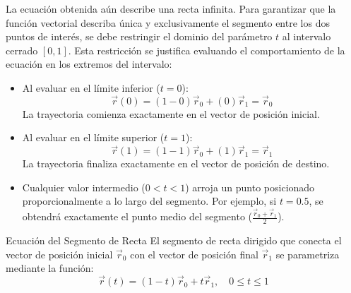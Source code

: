La ecuación obtenida aún describe una recta infinita. Para garantizar que la función vectorial describa única y exclusivamente el segmento entre los dos puntos de interés, se debe restringir el dominio del parámetro $t$ al intervalo cerrado $[0, 1]$. Esta restricción se justifica evaluando el comportamiento de la ecuación en los extremos del intervalo:

\begin{itemize}
    \item Al evaluar en el límite inferior ($t = 0$): 
    \[ \vec{r}(0) = (1 - 0)\vec{r}_0 + (0)\vec{r}_1 = \vec{r}_0 \] 
    La trayectoria comienza exactamente en el vector de posición inicial.
    
    \item Al evaluar en el límite superior ($t = 1$): 
    \[ \vec{r}(1) = (1 - 1)\vec{r}_0 + (1)\vec{r}_1 = \vec{r}_1 \] 
    La trayectoria finaliza exactamente en el vector de posición de destino.
    
    \item Cualquier valor intermedio ($0 < t < 1$) arroja un punto posicionado proporcionalmente a lo largo del segmento. Por ejemplo, si $t = 0.5$, se obtendrá exactamente el punto medio del segmento ($\frac{\vec{r}_0 + \vec{r}_1}{2}$).
\end{itemize}

\begin{mydefinition}{Ecuación del Segmento de Recta}
El segmento de recta dirigido que conecta el vector de posición inicial $\vec{r}_0$ con el vector de posición final $\vec{r}_1$ se parametriza mediante la función:
\[ \vec{r}(t) = (1 - t)\vec{r}_0 + t\vec{r}_1, \quad 0 \leq t \leq 1 \]
\end{mydefinition}

